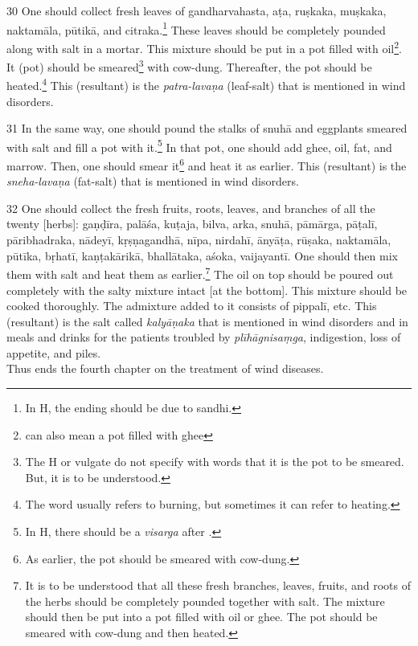 \begin{translation}
    \item[30]
    One should collect fresh leaves of \gls{gandharvahasta}, \gls{aṭa}, \gls{ruṣkaka}, \gls{muṣkaka}, \gls{naktamāla}, \gls{pūtikā}, and \gls{citraka}.\footnote{In H, the ending  should be  due to sandhi.} These leaves should be completely pounded along with salt in a mortar. This mixture should be put in a pot filled with oil\footnote{ can also mean a pot filled with ghee}. It (pot) should be smeared\footnote{The H or vulgate do not specify with words that it is the pot to be smeared. But, it is to be understood.} with cow-dung. Thereafter, the pot should be heated.\footnote{The word  usually refers to burning, but sometimes it can refer to heating.} This (resultant) is the \textit{patra-lavaṇa} (leaf-salt) that is mentioned in wind disorders. 

    \item[31]
    In the same way, one should pound the stalks of \gls{snuhā} and eggplants smeared with salt and fill a pot with it.\footnote{In H, there should be a \textit{visarga} after .} In that pot, one should add ghee, oil, fat, and marrow. Then, one should smear it\footnote{As earlier, the pot should be smeared with cow-dung.} and heat it as earlier. This (resultant) is the \textit{sneha-lavaṇa} (fat-salt) that is mentioned in wind disorders.

    \item[32]
    One should collect the fresh fruits, roots, leaves, and branches of all the twenty [herbs]: \gls{gaṇḍīra}, \gls{palāśa}, \gls{kuṭaja}, \gls{bilva}, \gls{arka}, \gls{snuhā}, \gls{pāmārga}, \gls{pāṭalī}, \gls{pāribhadraka}, \gls{nādeyī}, \gls{kṛṣṇagandhā}, \gls{nīpa}, \gls{nirdahī}, \gls{ānyāṭa}, \gls{rūṣaka}, \gls{naktamāla}, \gls{pūtīka}, \gls{bṛhatī}, \gls{kaṇṭakārikā}, \gls{bhallātaka}, \gls{aśoka}, \gls{vaijayantī}. One should then mix them with salt and heat them as earlier.\footnote{It is to be understood that all these fresh branches, leaves, fruits, and roots of the herbs should be completely pounded together with salt. The mixture should then be put into a pot filled with oil or ghee. The pot should be smeared with cow-dung and then heated.} The oil on top should be poured out completely with the salty mixture intact [at the bottom]. This mixture should be cooked thoroughly. The admixture added to it consists of \gls{pippalī}, etc. This (resultant) is the salt called \textit{kalyāṇaka} that is mentioned in wind disorders and in meals and drinks for the patients troubled by \textit{plīhāgnisaṃga}, indigestion, loss of appetite, and piles.\\ 


    Thus ends the fourth chapter on the treatment of wind diseases. 
    
\end{translation}
